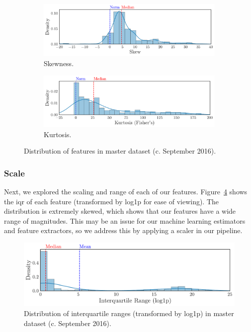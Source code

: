 \documentclass[../thesis/thesis.tex]{subfiles}
\begin{document}
\begin{figure}[!htb]
    \centering
    \begin{subfigure}{\textwidth}
        \includegraphics[width=\textwidth]{../figures/design/skew}
        \caption[Distribution of skewness by feature]{Skewness.}
        \label{fig:design:normality:skew}
    \end{subfigure}
    \begin{subfigure}{\textwidth}
        \includegraphics[width=\textwidth]{../figures/design/kurtosis}
        \caption[Distribution of kurtosis by feature]{Kurtosis.}
        \label{fig:design:normality:kurtosis}
    \end{subfigure}
    \caption[Distribution of skewness and kurtosis]{Distribution of features in master dataset (c. September 2016).}
    \label{fig:design:normality}
\end{figure}

\subsubsection{Scale}

Next, we explored the scaling and range of each of our features. Figure~\ref{fig:design:scaling} shows the \gls{iqr} of each feature (transformed by log1p for ease of viewing). The distribution is extremely skewed, which shows that our features have a wide range of magnitudes. This may be an issue for our machine learning estimators and feature extractors, so we address this by applying a scaler in our pipeline.

\begin{figure}[!htb]
    \centering
    \includegraphics[width=\textwidth]{../figures/design/scaling}
    \caption[Distribution of interquartile ranges]{Distribution of interquartile ranges (transformed by log1p) in master dataset (c. September 2016).}
    \label{fig:design:scaling}
\end{figure}
\end{document}
